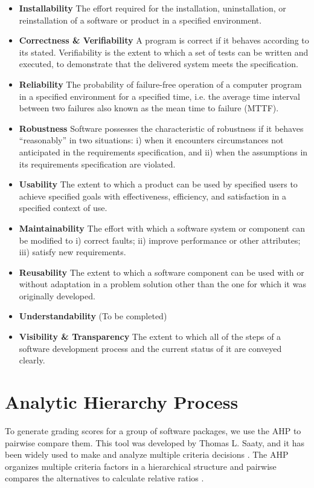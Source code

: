 \begin{itemize}
\label{def_installability}
\item \textbf{Installability} The effort required for the installation, uninstallation, or reinstallation of a software or product in a specified environment.
\label{def_correctness_verifiability}
\item \textbf{Correctness \& Verifiability} A program is correct if it behaves according to its stated. Verifiability is the extent to which a set of tests can be written and executed, to demonstrate that the delivered system meets the specification.
\label{def_reliability}
\item \textbf{Reliability} The probability of failure-free operation of a computer program in a specified environment for a specified time, i.e. the average time interval between two failures also known as the mean time to failure (MTTF).
\label{def_robustness}
\item \textbf{Robustness} Software possesses the characteristic of robustness if it behaves ``reasonably'' in two situations: i) when it encounters circumstances not anticipated in the requirements specification, and ii) when the assumptions in its requirements specification are violated.
\label{def_usability}
\item \textbf{Usability} The extent to which a product can be used by specified users to achieve specified goals with effectiveness, efficiency, and satisfaction in a specified context of use.
\label{def_maintainability}
\item \textbf{Maintainability} The effort with which a software system or component can be modified to i) correct faults; ii) improve performance or other attributes; iii) satisfy new requirements.
\label{def_reusability}
\item \textbf{Reusability} The extent to which a software component can be used with or without adaptation in a problem solution other than the one for which it was originally developed.
\label{def_understandability}
\item \textbf{Understandability} (To be completed)
\label{def_visibility_transparency}
\item \textbf{Visibility \& Transparency} The extent to which all of the steps of a software development process and the current status of it are conveyed clearly.
\end{itemize}

\section{Analytic Hierarchy Process}
To generate grading scores for a group of software packages, we use the AHP to pairwise compare them. This tool was developed by Thomas L. Saaty, and it has been widely used to make and analyze multiple criteria decisions \cite{VaidyaEtAl2006}. The AHP organizes multiple criteria factors in a hierarchical structure and pairwise compares the alternatives to calculate relative ratios \cite{Saaty1990}.

